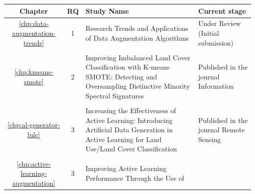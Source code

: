 \begin{table}[ht]
    \centering
    \begin{tabular}{ccm{}m{}}
        \toprule
        Chapter & RQ & Study Name                                                        & Current stage  \\
        \midrule
        \ref{chp:data-augmentation-trends} & 1    & Research Trends and Applications 
                                                   of Data Augmentation
                                                   Algorithms                          & Under Review 
                                                                                    (Initial submission)  \\
        \vspace{-.2cm}\\
        \ref{chp:kmeans-smote}             & 2    & Improving Imbalanced Land Cover 
                                                   Classification with K-means SMOTE: 
                                                   Detecting and Oversampling 
                                                   Distinctive Minority Spectral 
                                                   Signatures                          & Published in 
                                                                                         the journal 
                                                                                         Information      \\
        \vspace{-.2cm}\\
        \ref{chp:al-generator-lulc}        & 3    & Increasing the Effectiveness of 
                                                   Active Learning: Introducing
                                                   Artificial Data Generation in 
                                                   Active Learning for Land Use/Land 
                                                   Cover Classification                & Published in 
                                                                                         the journal 
                                                                                         Remote Sensing   \\
        \vspace{-.2cm}\\
        \ref{chp:active-learning-augmentation} & 3 & Improving Active Learning 
                                                   Performance Through the Use of

\end{tabular}
\end{table}
